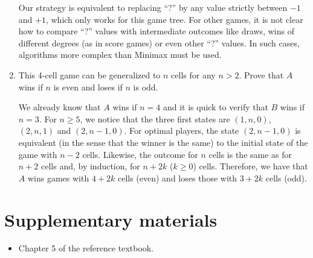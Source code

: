 \documentclass[11pt, a4paper]{article}
\begin{document}
\begin{enumerate}
\begin{solution}
\begin{figure}[H]
{}
        \end{figure}

        Our strategy is equivalent to replacing \enquote{?} by any value strictly between $-1$ and $+1$, which only works for this game tree. For other games, it is not clear how to compare \enquote{?} values with intermediate outcomes like draws, wins of different degrees (as in score games) or even other \enquote{?} values. In such cases, algorithms more complex than Minimax must be used.
    \end{solution}

    \item This 4-cell game can be generalized to $n$ cells for any $n > 2$. Prove that $A$ wins if $n$ is even and loses if $n$ is odd.

    \begin{solution}
        We already know that $A$ wins if $n = 4$ and it is quick to verify that $B$ wins if $n = 3$. For $n \geq 5$, we notice that the three first states are $(1, n, 0)$, $(2, n, 1)$ and $(2, n - 1, 0)$. For optimal players, the state $(2, n - 1, 0)$ is equivalent (in the sense that the winner is the same) to the initial state of the game with $n - 2$ cells. Likewise, the outcome for $n$ cells is the same as for $n + 2$ cells and, by induction, for $n + 2k$ ($k \geq 0$) cells. Therefore, we have that $A$ wins games with $4 + 2k$ cells (even) and loses those with $3 + 2k$ cells (odd).
    \end{solution}
\end{enumerate}

\newpage

\section*{Supplementary materials}

\begin{itemize}
    \item Chapter 5 of the reference textbook.
\end{itemize}
\end{document}
